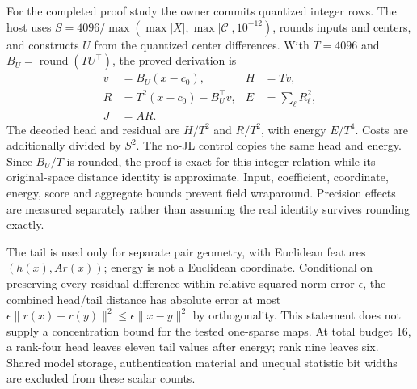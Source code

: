 For the completed proof study the owner commits quantized integer rows. The host uses $S=4096/\max(\max|X|,\max|\mathcal C|,10^{-12})$, rounds inputs and centers, and constructs $U$ from the quantized center differences. With $T=4096$ and $B_U=\operatorname{round}(TU^\top)$, the proved derivation is
\begin{align}
v&=B_U(x-c_0), & H&=Tv,\nonumber\\
R&=T^2(x-c_0)-B_U^\top v, & E&=\sum_\ell R_\ell^2,\label{eq:protected-integer}\\
J&=AR.\nonumber
\end{align}
The decoded head and residual are $H/T^2$ and $R/T^2$, with energy $E/T^4$. Costs are additionally divided by $S^2$. The no-JL control copies the same head and energy. Since $B_U/T$ is rounded, the proof is exact for this integer relation while its original-space distance identity is approximate. Input, coefficient, coordinate, energy, score and aggregate bounds prevent field wraparound. Precision effects are measured separately rather than assuming the real identity survives rounding exactly.

The tail is used only for separate pair geometry, with Euclidean features $(h(x),Ar(x))$; energy is not a Euclidean coordinate. Conditional on preserving every residual difference within relative squared-norm error $\epsilon$, the combined head/tail distance has absolute error at most $\epsilon\|r(x)-r(y)\|^2\leq\epsilon\|x-y\|^2$ by orthogonality. This statement does not supply a concentration bound for the tested one-sparse maps. At total budget 16, a rank-four head leaves eleven tail values after energy; rank nine leaves six. Shared model storage, authentication material and unequal statistic bit widths are excluded from these scalar counts.

